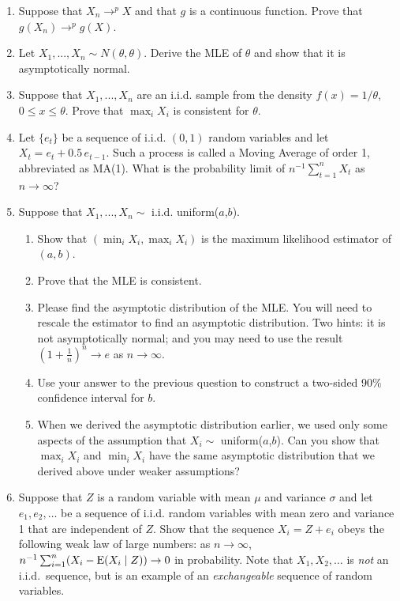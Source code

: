 \begin{enumerate}
\item Suppose that $X_n \to^p X$ and that $g$ is a continuous function.
  Prove that $g(X_n) \to^p g(X)$.

\item Let $X_1,...,X_n \sim N(\theta, \theta)$.  Derive the MLE of $\theta$ and show that
  it is asymptotically normal.

\item Suppose that $X_1,...,X_n$ are an i.i.d. sample from the density
  $f(x) = 1/\theta$, $0 \leq x \leq \theta$.  Prove that $\max_i X_i$ is consistent
  for $\theta$.

\item Let $\{e_t\}$ be a sequence of i.i.d. $(0,1)$ random variables
  and let $X_t = e_t + 0.5\, e_{t-1}$.  Such a process is called a
  Moving Average of order 1, abbreviated as MA(1).  What is the
  probability limit of $n^{-1} \sum_{t=1}^n X_t$ as $n \to \infty$?

\item Suppose that $X_1,...,X_n \sim$ i.i.d. uniform($a$,$b$).
  \begin{enumerate}
  \item Show that $(\min_i X_i, \max_i X_i)$ is the maximum likelihood
    estimator of $(a,b)$.
  \item Prove that the MLE is consistent.
  \item Please find the asymptotic distribution of the MLE.  You will
    need to rescale the estimator to find an asymptotic distribution.
    Two hints: it is not asymptotically normal; and you may need to
    use the result $(1 + \tfrac{1}{n})^n \to e$ as $n \to \infty$.
  \item Use your answer to the previous question to construct a
    two-sided 90\% confidence interval for $b$.
  \item When we derived the asymptotic distribution earlier, we used
    only some aspects of the assumption that $X_i \sim$ uniform($a$,$b$).
    Can you show that $\max_i X_i$ and $\min_i X_i$ have the same
    asymptotic distribution that we derived above under weaker
    assumptions?
  \end{enumerate}

\item Suppose that $Z$ is a random variable with mean $\mu$ and
  variance $\sigma$ and let $e_1,e_2,\dots$ be a sequence of
  i.i.d. random variables with mean zero and variance 1 that are
  independent of $Z$.  Show that the sequence $X_i = Z + e_i$ obeys
  the following weak law of large numbers: as $n \to \infty$, $n^{-1}
  \sum_{i=1}^n ( X_i - \operatorname{E}(X_i \mid Z) ) \to 0$ in probability.  Note
  that $X_1,X_2,\dots$ is \emph{not} an i.i.d.\ sequence, but is an
  example of an \emph{exchangeable} sequence of random variables.


\end{enumerate}
